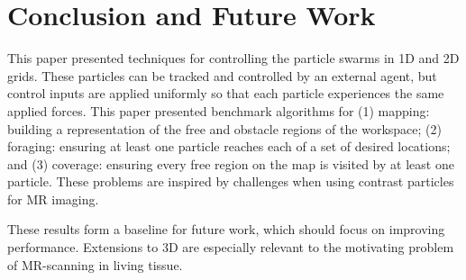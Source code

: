 \section{Conclusion and Future Work}\label{sec:conclusion}

This paper presented techniques for controlling the particle swarms in 1D and  2D grids.
These particles can be tracked and controlled by an external agent, but control inputs are applied uniformly so that each particle experiences the same applied forces. 
This paper presented benchmark algorithms for (1) mapping: building a representation of the free and obstacle regions of the workspace;
(2) foraging: ensuring at least one particle reaches each of a set of desired locations; 
and (3) coverage: ensuring every free region on the map is visited by at least one particle.
 These problems are inspired by challenges when using contrast particles for MR imaging.

These results form a baseline for future work, which should focus on improving performance. 
Extensions to 3D are especially relevant to the motivating problem of MR-scanning in living tissue.